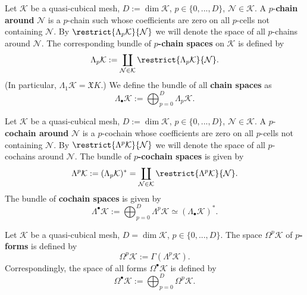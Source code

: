 \begin{definition}
  Let
    $\mathcal{K}$ be a quasi-cubical mesh,
    $D := \dim \mathcal{K}$,
    $p \in \{0, ..., D\}$,
    $\mathcal{N} \in \mathcal{K}$.
  A $p$-\textbf{chain around} $\mathcal{N}$ is a $p$-chain such whose
  coefficients are zero on all $p$-cells not containing $\mathcal{N}$.
  By $\restrict{\Lambda_p \mathcal{K}}{\mathcal{N}}$ we will denote the space of
  all $p$-chains around $\mathcal{N}$.
  The corresponding bundle of \textbf{$p$-chain spaces} on $\mathcal{K}$
  is defined by
  \begin{equation}
    \Lambda_p \mathcal{K}
    := \coprod_{\mathcal{N} \in \mathcal{K}}
      \restrict{\Lambda_p \mathcal{K}}{\mathcal{N}}.
  \end{equation}
  (In particular, $\Lambda_1 \mathcal{K} = \mathfrak{X} K$.)
  We define the bundle of all \textbf{chain spaces} as
  \begin{equation}
    \Lambda_\bullet \mathcal{K} := \bigoplus_{p = 0}^D \Lambda_p \mathcal{K}.
  \end{equation}
\end{definition}
\begin{definition}
  Let
    $\mathcal{K}$ be a quasi-cubical mesh,
    $D := \dim \mathcal{K}$,
    $p \in \{0, ..., D\}$,
    $\mathcal{N} \in \mathcal{K}$.
  A $p$-\textbf{cochain around} $\mathcal{N}$ is a $p$-cochain whose
  coefficients are zero on all $p$-cells not containing $\mathcal{N}$.
  By $\restrict{\Lambda^p \mathcal{K}}{\mathcal{N}}$ we will denote the space of
  all $p$-cochains around $\mathcal{N}$.
  The bundle of \textbf{$p$-cochain spaces} is given by
  \begin{equation}
    \Lambda^p \mathcal{K}
    := (\Lambda_p \mathcal{K})^*
    = \coprod_{\mathcal{N} \in \mathcal{K}}
      \restrict{\Lambda^p \mathcal{K}}{\mathcal{N}}.
  \end{equation}
  The bundle of \textbf{cochain spaces} is given by
  \begin{equation}
    \Lambda^\bullet \mathcal{K}
     := \bigoplus_{p = 0}^D \Lambda^p \mathcal{K}
     \simeq (\Lambda_\bullet \mathcal{K})^*.
  \end{equation}
\end{definition}
\begin{definition}
  Let
    $\mathcal{K}$ be a quasi-cubical mesh,
    $D = \dim \mathcal{K}$,
    $p \in \{0, ..., D\}$.
  The space $\Omega^p \mathcal{K}$ of \textbf{$p$-forms} is defined by
  \begin{equation}
    \Omega^p \mathcal{K} := \Gamma(\Lambda^p \mathcal{K}).
  \end{equation}
  Correspondingly, the space of all forms $\Omega^\bullet \mathcal{K}$
  is defined by
  \begin{equation}
    \Omega^\bullet \mathcal{K}
     := \bigoplus_{p = 0}^D \Omega^p \mathcal{K}.
  \end{equation}
\end{definition}
